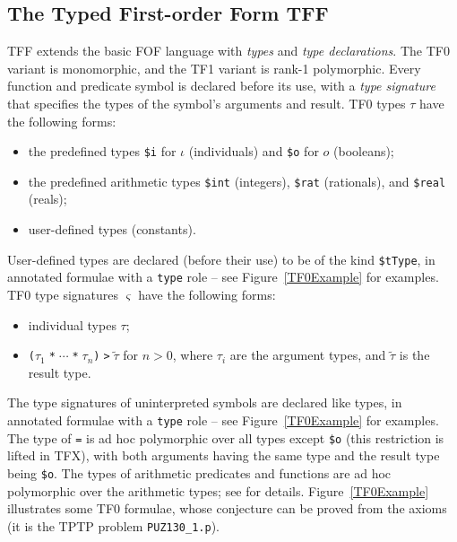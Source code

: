 \documentclass{easychair}
\begin{document}
\subsection{The Typed First-order Form TFF}
\label{TFF}

TFF extends the basic FOF language with {\em types} and {\em type
declarations}.
The TF0 variant is monomorphic, and the TF1 variant is rank-1 polymorphic.
Every function and predicate symbol is declared before its use, with
a {\em type signature} that specifies the types of the symbol's arguments
and result.
TF0 types $\tau$ have the following forms:
\begin{itemize}
\item the predefined types {\tt \$i} for $\iota$ (individuals) and
      {\tt \$o} for $o$ (booleans);
\item the predefined arithmetic types {\tt \$int} (integers), {\tt \$rat}
      (rationals), and {\tt \$real} (reals);
\item user-defined types (constants).
\end{itemize}
User-defined types are declared (before their use) to be of the kind
{\tt \$tType}, in annotated formulae with a {\tt type} role -- see
Figure~\ref{TF0Example} for examples.
TF0 type signatures $\varsigma$ have the following forms:
\begin{itemize}
\item individual types $\tau$;
\item {\tt ($\tau_1\;$*$\;{\cdots}\;$*$\;\tau_n$)$\;$>$\;\tilde \tau$}
      for $n > 0$, where $\tau_i$ are the argument types, and $\tilde \tau$
      is the result type.
\end{itemize}
The type signatures of uninterpreted symbols are declared like types, in
annotated formulae with a {\tt type} role -- see Figure~\ref{TF0Example}
for examples.
The type of {\tt =} is ad hoc polymorphic over all types except {\tt \$o} (this
restriction is lifted in TFX), with both arguments having the same type and 
the result type being {\tt \$o}.
The types of arithmetic predicates and functions are ad hoc polymorphic
over the arithmetic types; see \cite{SS+12} for details.
Figure~\ref{TF0Example} illustrates some TF0 formulae, whose conjecture can
be proved from the axioms (it is the TPTP problem {\tt PUZ130\_1.p}).
\end{document}
